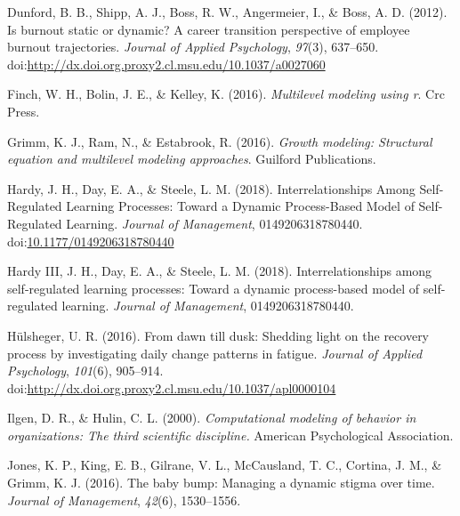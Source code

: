 \documentclass[english,,man]{apa6}
\theoremstyle{definition}
\theoremstyle{definition}
\theoremstyle{definition}
\theoremstyle{remark}
\begin{document}
\leavevmode\hypertarget{ref-dunford_is_2012}{}%
Dunford, B. B., Shipp, A. J., Boss, R. W., Angermeier, I., \& Boss, A.
D. (2012). Is burnout static or dynamic? A career transition perspective
of employee burnout trajectories. \emph{Journal of Applied Psychology},
\emph{97}(3), 637--650.
doi:\href{https://doi.org/http://dx.doi.org.proxy2.cl.msu.edu/10.1037/a0027060}{http://dx.doi.org.proxy2.cl.msu.edu/10.1037/a0027060}

\leavevmode\hypertarget{ref-finch2016multilevel}{}%
Finch, W. H., Bolin, J. E., \& Kelley, K. (2016). \emph{Multilevel
modeling using r}. Crc Press.

\leavevmode\hypertarget{ref-grimm_growth_2016}{}%
Grimm, K. J., Ram, N., \& Estabrook, R. (2016). \emph{Growth modeling:
Structural equation and multilevel modeling approaches}. Guilford
Publications.

\leavevmode\hypertarget{ref-hardy_interrelationships_2018}{}%
Hardy, J. H., Day, E. A., \& Steele, L. M. (2018). Interrelationships
Among Self-Regulated Learning Processes: Toward a Dynamic Process-Based
Model of Self-Regulated Learning. \emph{Journal of Management},
0149206318780440.
doi:\href{https://doi.org/10.1177/0149206318780440}{10.1177/0149206318780440}

\leavevmode\hypertarget{ref-hardy2018}{}%
Hardy III, J. H., Day, E. A., \& Steele, L. M. (2018).
Interrelationships among self-regulated learning processes: Toward a
dynamic process-based model of self-regulated learning. \emph{Journal of
Management}, 0149206318780440.

\leavevmode\hypertarget{ref-hulsheger_dawn_2016}{}%
Hülsheger, U. R. (2016). From dawn till dusk: Shedding light on the
recovery process by investigating daily change patterns in fatigue.
\emph{Journal of Applied Psychology}, \emph{101}(6), 905--914.
doi:\href{https://doi.org/http://dx.doi.org.proxy2.cl.msu.edu/10.1037/apl0000104}{http://dx.doi.org.proxy2.cl.msu.edu/10.1037/apl0000104}

\leavevmode\hypertarget{ref-ilgen_computational_2000}{}%
Ilgen, D. R., \& Hulin, C. L. (2000). \emph{Computational modeling of
behavior in organizations: The third scientific discipline.} American
Psychological Association.

\leavevmode\hypertarget{ref-jones_baby_2016}{}%
Jones, K. P., King, E. B., Gilrane, V. L., McCausland, T. C., Cortina,
J. M., \& Grimm, K. J. (2016). The baby bump: Managing a dynamic stigma
over time. \emph{Journal of Management}, \emph{42}(6), 1530--1556.
\end{document}
